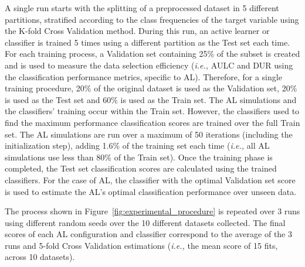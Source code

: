 \documentclass[preprint, 12pt]{elsarticle}
\begin{document}
A single run starts with the splitting of a preprocessed dataset in 5
different partitions, stratified according to the class frequencies of the
target variable using the K-fold Cross Validation method. During this run, an
active learner or classifier is trained 5 times using a different partition as
the Test set each time. For each training process, a Validation set containing
25\% of the subset is created and is used to measure the data selection
efficiency (\textit{i.e.,} AULC and DUR using the classification performance
metrics, specific to AL). Therefore, for a single training procedure, 20\% of
the original dataset is used as the Validation set, 20\% is used as the Test
set and 60\% is used as the Train set. The AL simulations and the classifiers'
training occur within the Train set. However, the classifiers used to find the
maximum performance classification scores are trained over the full Train set.
The AL simulations are run over a maximum of 50 iterations (including the
initialization step), adding 1.6\% of the training set each time
(\textit{i.e.,} all AL simulations use less than 80\% of the Train set). Once
the training phase is completed, the Test set classification scores are
calculated using the trained classifiers. For the case of AL, the classifier
with the optimal Validation set score is used to estimate the AL's optimal
classification performance over unseen data.

The process shown in Figure~\ref{fig:experimental_procedure} is repeated over
3 runs using different random seeds over the 10 different datasets collected.
The final scores of each AL configuration and classifier correspond to the
average of the 3 runs and 5-fold Cross Validation estimations (\textit{i.e.,}
the mean score of 15 fits, across 10 datasets).
\end{document}
